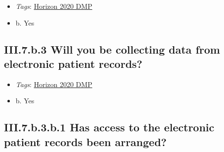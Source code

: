 \documentclass[a4paper,12pt]{report}
\begin{document}
\label{b1df3c74-0b1f-4574-81c4-4cc2d780c1af.f038bd46-ee4e-4f53-b7ea-482381c2c855.4fd89b13-f33c-4858-8b25-ab6da271efc6.36a5ed1e-ecd5-4b86-a719-f1196e376a52}


\begin{itemize}
  \item \textit{Tags}: \ul{Horizon 2020 DMP}
  \end{itemize}




\begin{itemize}
  \item[\CheckmarkBold] b. Yes
\end{itemize}




\subsection*{\protect\textcolor{colorSecId}{III.7.b.3} Will you be collecting data from electronic patient records?}

\label{b1df3c74-0b1f-4574-81c4-4cc2d780c1af.f038bd46-ee4e-4f53-b7ea-482381c2c855.4fd89b13-f33c-4858-8b25-ab6da271efc6.7e456b72-72a1-427d-8e75-9da096bc9806}


\begin{itemize}
  \item \textit{Tags}: \ul{Horizon 2020 DMP}
  \end{itemize}




\begin{itemize}
  \item[\CheckmarkBold] b. Yes
\end{itemize}




\subsection*{\protect\textcolor{colorSecId}{III.7.b.3.b.1} Has access to the electronic patient records been arranged?}

\label{b1df3c74-0b1f-4574-81c4-4cc2d780c1af.f038bd46-ee4e-4f53-b7ea-482381c2c855.4fd89b13-f33c-4858-8b25-ab6da271efc6.7e456b72-72a1-427d-8e75-9da096bc9806.2d3d08b8-7d63-4645-9499-f465caa06204.4eb1bd6f-5d10-4b0a-aab1-715facc29cbb}
\end{document}
